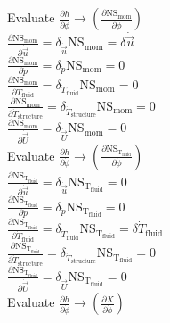 \documentclass[10pt]{article} %
\begin{document}
\begin{center}
	Evaluate $\frac{\partial h}{\partial \dot \phi} \rightarrow \left( \frac{\partial \text{NS}_{\text{mom}}}{\partial \dot \phi}\right)$\\
	$\frac{\partial \text{NS}_{\text{mom}}}{\partial \dot \vec{u}} =  \delta_{\dot \vec{u}} \text{NS}_{\text{mom}} = \delta \dot \vec{u} $\\
	$\frac{\partial \text{NS}_{\text{mom}}}{\partial \dot p} = \delta_{\dot p} \text{NS}_{\text{mom}} = 0 $\\
	$\frac{\partial \text{NS}_{\text{mom}}}{\partial \dot T_{\text{fluid}}} = \delta_{\dot T_{\text{fluid}}} \text{NS}_{\text{mom}} = 0$\\
	$\frac{\partial \text{NS}_{\text{mom}}}{\partial \dot T_{\text{structure}}} = \delta_{\dot T_{\text{structure}}} \text{NS}_{\text{mom}} = 0$\\
	$\frac{\partial \text{NS}_{\text{mom}}}{\partial \dot \vec{U}} = \delta_{\dot \vec{U}} \text{NS}_{\text{mom}} = 0$\\$ $\\

	Evaluate $\frac{\partial h}{\partial \dot \phi} \rightarrow \left( \frac{\partial \text{NS}_{\text{T}_{\text{fluid}}}}{\partial \dot \phi}\right)$\\
	$\frac{\partial \text{NS}_{\text{T}_{\text{fluid}}}}{\partial \dot \vec{u}} = \delta_{\dot \vec{u}} \text{NS}_{\text{T}_{\text{fluid}}} = 0$\\
	$\frac{\partial \text{NS}_{\text{T}_{\text{fluid}}}}{\partial \dot p} = \delta_{\dot p} \text{NS}_{\text{T}_{\text{fluid}}} = 0 $\\
	$\frac{\partial \text{NS}_{\text{T}_{\text{fluid}}}}{\partial \dot T_{\text{fluid}}} = \delta_{\dot T_{\text{fluid}}} \text{NS}_{\text{T}_{\text{fluid}}} = \delta \dot T_{\text{fluid}} $\\
	$\frac{\partial \text{NS}_{\text{T}_{\text{fluid}}}}{\partial \dot T_{\text{structure}}} = \delta_{\dot T_{\text{structure}}} \text{NS}_{\text{T}_{\text{fluid}}} = 0$\\
	$\frac{\partial \text{NS}_{\text{T}_{\text{fluid}}}}{\partial \dot \vec{U}} = \delta_{\dot \vec{U}} \text{NS}_{\text{T}_{\text{fluid}}} = 0$\\$ $\\

	Evaluate $\frac{\partial h}{\partial \dot \phi} \rightarrow \left( \frac{\partial X}{\partial \dot \phi}\right)$\\$ $\\


\end{center}
\end{document}
